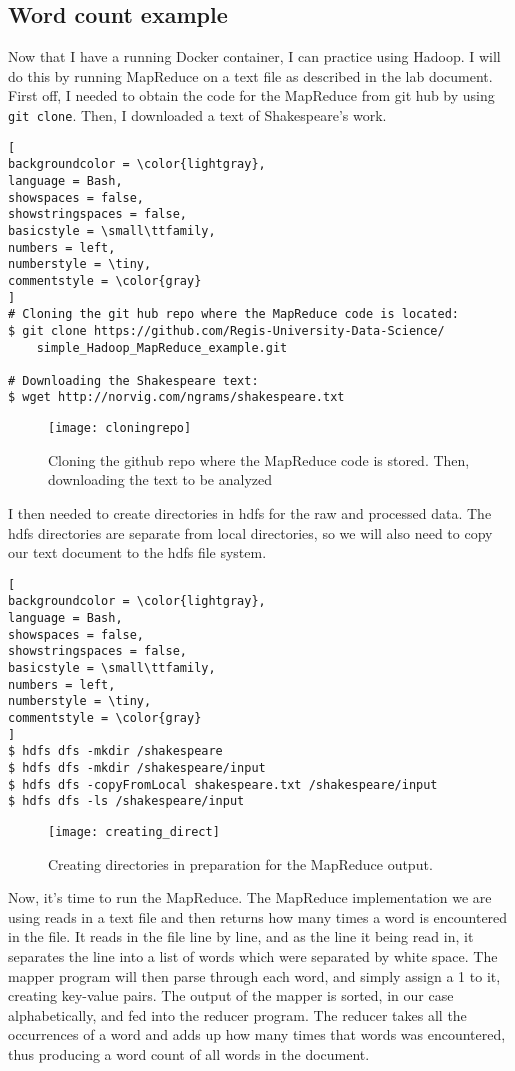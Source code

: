 \documentclass[]{article}
\newcommand{\code}[1]{\colorbox{light-gray}{\texttt{#1}}}
\begin{document}
\subsection{Word count example}
Now that I have a running Docker container, I can practice using Hadoop.  I will do this by running MapReduce on a text file as described in the lab document.  First off, I needed to obtain the code for the MapReduce from git hub by using \code{git clone}.  Then, I downloaded a text of Shakespeare's work.
\begin{lstlisting}[
backgroundcolor = \color{lightgray},
language = Bash,
showspaces = false,
showstringspaces = false,
basicstyle = \small\ttfamily,
numbers = left,
numberstyle = \tiny,
commentstyle = \color{gray}
]
# Cloning the git hub repo where the MapReduce code is located:
$ git clone https://github.com/Regis-University-Data-Science/
	simple_Hadoop_MapReduce_example.git
	
# Downloading the Shakespeare text:
$ wget http://norvig.com/ngrams/shakespeare.txt
\end{lstlisting}
\begin{figure}[!h]
	\texttt{[image: cloningrepo]}
	\caption{Cloning the github repo where the MapReduce code is stored.  Then, downloading the text to be analyzed}
	\label{Fig:Race}
\end{figure}
I then needed to create directories in hdfs for the raw and processed data.  The hdfs directories are separate from local directories, so we will also need to copy our text document to the hdfs file system.

\begin{lstlisting}[
backgroundcolor = \color{lightgray},
language = Bash,
showspaces = false,
showstringspaces = false,
basicstyle = \small\ttfamily,
numbers = left,
numberstyle = \tiny,
commentstyle = \color{gray}
]
$ hdfs dfs -mkdir /shakespeare
$ hdfs dfs -mkdir /shakespeare/input
$ hdfs dfs -copyFromLocal shakespeare.txt /shakespeare/input
$ hdfs dfs -ls /shakespeare/input
\end{lstlisting}
\begin{figure}[!h]
	\texttt{[image: creating\_direct]}
	\caption{Creating directories in preparation for the MapReduce output.}
	\label{Fig:Race}
\end{figure}
Now, it's time to run the MapReduce.  The MapReduce implementation we are using reads in a text file and then returns how many times a word is encountered in the file.  It reads in the file line by line, and as the line it being read in, it separates the line into a list of words which were separated by white space.  The mapper program will then parse through each word, and simply assign a 1 to it, creating key-value pairs.  The output of the mapper is sorted, in our case alphabetically, and fed into the reducer program.  The reducer takes all the occurrences of a word and adds up how many times that words was encountered, thus producing a word count of all words in the document.
\end{document}
